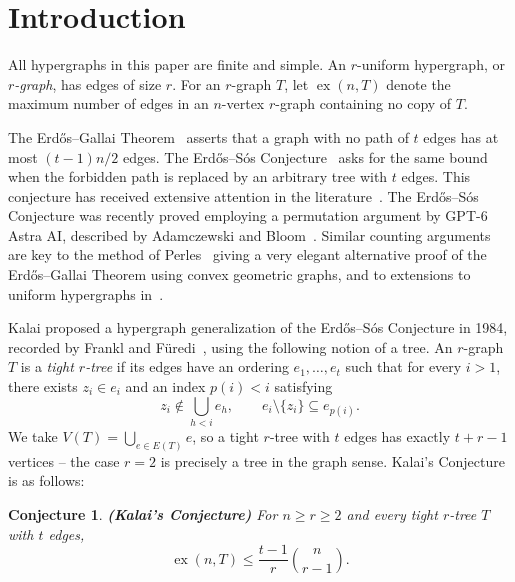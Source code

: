 \documentclass[11pt]{article}
\newtheorem{conjecture}{Conjecture}
\theoremstyle{remark}
\numberwithin{equation}{section}
\DeclareMathOperator{\ex}{ex}
\begin{document}
	
	\section{Introduction}\label{sec:introduction}
	
	All hypergraphs in this paper are finite and simple. An $r$-uniform
	hypergraph, or \emph{$r$-graph}, has edges of size $r$. For an $r$-graph
	$T$, let $\ex(n,T)$ denote the maximum number of edges in an $n$-vertex
	$r$-graph containing no copy of $T$. 
	
	The Erd\H{o}s--Gallai Theorem~\cite{EG} asserts that a graph with no
	path of $t$ edges has at most $(t-1)n/2$ edges. The
	Erd\H{o}s--S\'os Conjecture~\cite{Erdos} asks for the same bound when
	the forbidden path is replaced by an arbitrary tree with $t$ edges. This conjecture has received extensive attention in the literature~\cite{ASS,BPSS2019,BPSS2021,BD,DPRS,Erdos,Erdos1964,EG,ErdosSos1970,FanSun2007,GoerlichZak2016,HRSW2020,McLennan2005,Pokrovskiy2024,Rozhon2019,ReedStein2026,SacleWozniak1997,Stein,TinerTomlin2022,Wozniak1996}. The Erd\H{o}s--S\'os Conjecture was recently proved employing a permutation argument by GPT-6 Astra AI, described by Adamczewski and Bloom~\cite[Appendix B.4]{Epoch}. Similar counting arguments are key to the method of Perles~\cite{KupitzPerles} giving a very elegant alternative proof of the Erd\H{o}s--Gallai Theorem using convex geometric graphs, and to extensions to uniform hypergraphs in~\cite{FJKMVpaths}.
	
	
	Kalai proposed a hypergraph generalization of the Erd\H{o}s--S\'{o}s Conjecture in 1984, recorded by
	Frankl and F\"uredi~\cite{FF}, using the following notion of a tree. An $r$-graph $T$ is a \emph{tight $r$-tree} if its edges have an ordering
	$e_1,\ldots,e_t$ such that for every $i>1$, there exists
	$z_i\in e_i$ and an index $p(i)<i$ satisfying
	\begin{equation}\label{eq:tight-tree}
		z_i\notin\bigcup_{h<i}e_h,
		\qquad e_i\setminus\{z_i\}\subseteq e_{p(i)}.
	\end{equation}
	We take $V(T)=\bigcup_{e\in E(T)}e$, so a tight $r$-tree with $t$
	edges has exactly $t+r-1$ vertices -- the case $r = 2$ is precisely a tree in the graph sense. Kalai's Conjecture is as follows:
	
	\begin{conjecture}\label{conj:kalai} {\bf (Kalai's Conjecture)} 
		For $n \geq r \geq 2$ and every tight $r$-tree $T$ with $t$ edges,
		\begin{equation}\label{eq:kalai-binomial}
			\ex(n,T)\le\frac{t-1}{r}\binom{n}{r-1}.
		\end{equation}
	\end{conjecture} 
	
\end{document}
